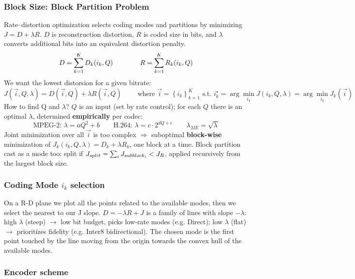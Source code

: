 \subsubsection{Block Size: Block Partition Problem}
Rate--distortion optimization selects coding modes and partitions by minimizing $J=D+\lambda R$. $D$ is reconstruction distortion, $R$ is coded size in bits, and $\lambda$ converts additional bits into an equivalent distortion penalty.
$$D = \sr{K}{k=1}D_k(i_k, Q) \qquad \qquad R = \sr{K}{k=1}R_k(i_k, Q)$$
We want the lowest distorsion for a given bitrate:
$$J(\vec{i},Q,\lambda ) = D(\vec{i},Q) + \lambda R(\vec{i},Q) \qquad \text{ where }\vec{i} = \left\{i_k\right\}_{k=1}^K \text{ s.t. }i_k^\star = \arg\min_{i_k} J(i_k,Q,\lambda) = \arg\min_{i_k} J_k(\vec{i})$$
How to find Q and $\lambda$? $Q$ is an input (set by rate control); for each $Q$ there is an optimal $\lambda$, determined \textbf{empirically} per codec:
$$\text{MPEG-2: } \lambda = aQ^2 + b \qquad \text{H.264: } \lambda = c\cdot2^{dQ+e} \qquad \lambda_{ME} = \sqrt{\lambda}$$
Joint minimization over all $\vec{i}$ is too complex $\Rightarrow$ suboptimal \textbf{block-wise} minimization of $J_k(i_k,Q,\lambda) = D_k + \lambda R_k$, one block at a time. Block partition cast as a mode too: split if $J_{split} = \sr{}{i}J_{subblock_i} < J_B$, applied recursively from the largest block size.
\subsubsection{Coding Mode $i_k$ selection}
On a R-D plane we plot all the points related to the available modes, then we select the nearest to our J slope.
$D = -\lambda R + J$ is a family of lines with slope $-\lambda$: high $\lambda$ (steep) $\to$ low bit budget, picks low-rate modes (e.g. Direct); low $\lambda$ (flat) $\to$ prioritizes fidelity (e.g. Inter8 bidirectional). The chosen mode is the first point touched by the line moving from the origin towards the convex hull of the available modes.
\subsubsection{Encoder scheme}

